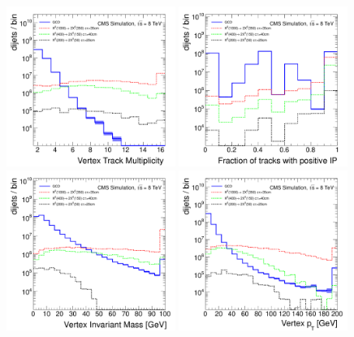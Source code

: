 \begin{enumerate}
\begin{figure}
\centering
\includegraphics[width=0.49\textwidth]{plots/discrimination/disc_vtxN.pdf}
\includegraphics[width=0.49\textwidth]{plots/discrimination/disc_Posip2dFrac.pdf}
\includegraphics[width=0.49\textwidth]{plots/discrimination/disc_vtxmass.pdf}
\includegraphics[width=0.49\textwidth]{plots/discrimination/disc_vtxpt.pdf}

\end{figure}
\end{enumerate}
